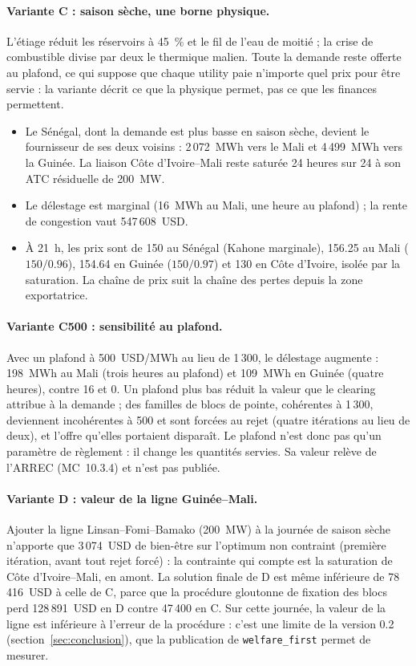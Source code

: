 \documentclass[a4paper,12pt]{article}
\theoremstyle{definition}
\newcommand{\MC}[1]{MC~#1}
\begin{document}
\paragraph{Variante C : saison sèche, une borne physique.} L'étiage réduit les réservoirs à 45~\% et le fil de l'eau de moitié ; la crise de combustible divise par deux le thermique malien. Toute la demande reste offerte au plafond, ce qui suppose que chaque utility paie n'importe quel prix pour être servie : la variante décrit ce que la physique permet, pas ce que les finances permettent.

\begin{itemize}
\item Le Sénégal, dont la demande est plus basse en saison sèche, devient le fournisseur de ses deux voisins : 2\,072~MWh vers le Mali et 4\,499~MWh vers la Guinée. La liaison Côte d'Ivoire--Mali reste saturée 24 heures sur 24 à son ATC résiduelle de 200~MW.
\item Le délestage est marginal (16~MWh au Mali, une heure au plafond) ; la rente de congestion vaut 547\,608~USD.
\item À 21~h, les prix sont de 150 au Sénégal (Kahone marginale), 156.25 au Mali ($150/0.96$), 154.64 en Guinée ($150/0.97$) et 130 en Côte d'Ivoire, isolée par la saturation. La chaîne de prix suit la chaîne des pertes depuis la zone exportatrice.
\end{itemize}

\paragraph{Variante C500 : sensibilité au plafond.} Avec un plafond à 500~USD/MWh au lieu de 1\,300, le délestage augmente : 198~MWh au Mali (trois heures au plafond) et 109~MWh en Guinée (quatre heures), contre 16 et 0. Un plafond plus bas réduit la valeur que le clearing attribue à la demande ; des familles de blocs de pointe, cohérentes à 1\,300, deviennent incohérentes à 500 et sont forcées au rejet (quatre itérations au lieu de deux), et l'offre qu'elles portaient disparaît. Le plafond n'est donc pas qu'un paramètre de règlement : il change les quantités servies. Sa valeur relève de l'ARREC (\MC{10.3.4}) et n'est pas publiée.

\paragraph{Variante D : valeur de la ligne Guinée--Mali.} Ajouter la ligne Linsan--Fomi--Bamako (200~MW) à la journée de saison sèche n'apporte que 3\,074~USD de bien-être sur l'optimum non contraint (première itération, avant tout rejet forcé) : la contrainte qui compte est la saturation de Côte d'Ivoire--Mali, en amont. La solution finale de D est même inférieure de 78\,416~USD à celle de C, parce que la procédure gloutonne de fixation des blocs perd 128\,891~USD en D contre 47\,400 en C. Sur cette journée, la valeur de la ligne est inférieure à l'erreur de la procédure : c'est une limite de la version 0.2 (section~\ref{sec:conclusion}), que la publication de \texttt{welfare\_first} permet de mesurer.
\end{document}
